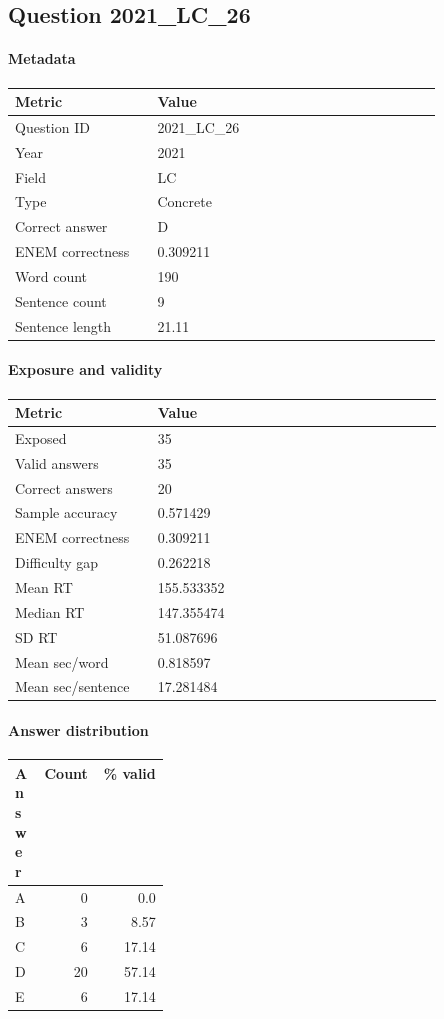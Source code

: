 \subsection*{Question 2021\_LC\_26}
\label{sec:q_2021_LC_26}
\paragraph{Metadata}
\begin{tabular}{p{0.30\linewidth}p{0.60\linewidth}}
\toprule
Metric & Value\\
\midrule
Question ID & 2021\_LC\_26\\
Year & 2021\\
Field & LC\\
Type & Concrete\\
Correct answer & D\\
ENEM correctness & 0.309211\\
Word count & 190\\
Sentence count & 9\\
Sentence length & 21.11\\
\bottomrule
\end{tabular}

\paragraph{Exposure and validity}
\begin{tabular}{p{0.30\linewidth}p{0.60\linewidth}}
\toprule
Metric & Value\\
\midrule
Exposed & 35\\
Valid answers & 35\\
Correct answers & 20\\
Sample accuracy & 0.571429\\
ENEM correctness & 0.309211\\
Difficulty gap & 0.262218\\
Mean RT & 155.533352\\
Median RT & 147.355474\\
SD RT & 51.087696\\
Mean sec/word & 0.818597\\
Mean sec/sentence & 17.281484\\
\bottomrule
\end{tabular}

\paragraph{Answer distribution}
\begin{tabular}{p{0.18\linewidth}rr}
\toprule
Answer & Count & \% valid\\
\midrule
A & 0 & 0.0\\
B & 3 & 8.57\\
C & 6 & 17.14\\
D & 20 & 57.14\\
E & 6 & 17.14\\
\bottomrule
\end{tabular}

